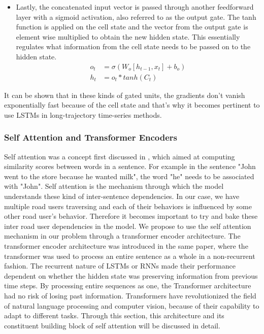 \documentclass{article}
\begin{document}
\begin{itemize}
\begin{equation}
    \end{equation}
    \item Lastly, the concatenated input vector is passed through another feedforward layer with a sigmoid activation, also referred to as the output gate. The tanh function is applied on the cell state and the vector from the output gate is element wise multiplied to obtain the new hidden state. This essentially regulates what information from the cell state needs to be passed on to the hidden state.
    \begin{equation}
        \begin{split}
            o_t&=\sigma(W_o[h_{t-1},x_t]+b_o)\\
            h_t&=o_t*tanh(C_t)
        \end{split}
    \end{equation}
    
\end{itemize}

It can be shown that in these kinds of gated units, the gradients don't vanish exponentially fast because of the cell state and that's why it becomes pertinent to use LSTMs in long-trajectory time-series methods. 

\subsubsection{Self Attention and Transformer Encoders}
Self attention was a concept first discussed in \cite{vaswani_attention_2017}, which aimed at computing similarity scores between words in a sentence. For example in the sentence "John went to the store because he wanted milk", the word "he" needs to be associated with "John". Self attention is the mechanism through which the model understands these kind of inter-sentence dependencies. In our case, we have multiple road users traversing and each of their behaviors is influenced by some other road user's behavior. Therefore it becomes important to try and bake these inter road user dependencies in the model.  We propose to use the self attention mechanism in our problem through a transformer encoder architecture. The transformer encoder architecture was introduced in the same paper, where the transformer was used to process an entire sentence as a whole in a non-recurrent fashion. The recurrent nature of LSTMs or RNNs made their performance dependent on whether the hidden state was preserving information from previous time steps. By processing entire sequences as one, the Transformer architecture had no risk of losing past information. Transformers have revolutionized the field of natural language processing and computer vision, because of their capability to adapt to different tasks. Through this section, this architecture and its constituent building block of self attention will be discussed in detail. 
\end{document}
